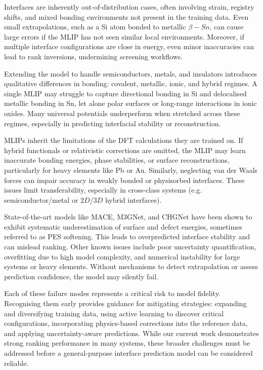Interfaces are inherently out-of-distribution cases, often involving strain, registry shifts, and mixed bonding environments not present in the training data\cite{Khot2025-hh, Gerber2023-yd, Batzner2022-fd, Saidi2017-ab}.
Even small extrapolations, such as a Si atom bonded to metallic $\beta-Sn$, can cause large errors if the MLIP has not seen similar local environments\cite{Khot2025-hh, Batzner2022-fd, Schutt2019-sz}.
Moreover, if multiple interface configurations are close in energy, even minor inaccuracies can lead to rank inversions, undermining screening workflows\cite{Leung2020-tv, Di_Liberto2022-gz, Gerber2023-yd}.

Extending the model to handle semiconductors, metals, and insulators introduces qualitative differences in bonding: covalent, metallic, ionic, and hybrid regimes.
A single MLIP may struggle to capture directional bonding in Si and delocalised metallic bonding in Sn, let alone polar surfaces or long-range interactions in ionic oxides\cite{Owen2024-wp, Butler2019-ws}.
Many universal potentials underperform when stretched across these regimes, especially in predicting interfacial stability or reconstruction\cite{Leung2020-tv, Deng2023-tg}.

MLIPs inherit the limitations of the DFT calculations they are trained on\cite{Schutt2019-sz, Deng2023-tg, Wang2024-tn}.
If hybrid functionals or relativistic corrections are omitted, the MLIP may learn inaccurate bonding energies, phase stabilities, or surface reconstructions, particularly for heavy elements like Pb or Au. Similarly, neglecting van der Waals forces can impair accuracy in weakly bonded or physisorbed interfaces.
These issues limit transferability, especially in cross-class systems (e.g. semiconductor/metal or $2D$/$3D$ hybrid interfaces)\cite{Schutt2019-sz, Leung2020-tv, Rosen2022-pw, Deng2023-tg}.

State-of-the-art models like MACE, M3GNet\cite{brlec2023_interfaceML}, and CHGNet have been shown to exhibit systematic underestimation of surface and defect energies, sometimes referred to as PES softening.
This leads to overpredicted interface stability and can mislead ranking.
Other known issues include poor uncertainty quantification, overfitting due to high model complexity, and numerical instability for large systems or heavy elements.
Without mechanisms to detect extrapolation or assess prediction confidence, the model may silently fail\cite{Batatia2022-xz, Deng2023-tg, Pitfield2025-ah}.

Each of these failure modes represents a critical risk to model fidelity.
Recognising them early provides guidance for mitigating strategies: expanding and diversifying training data, using active learning to discover critical configurations, incorporating physics-based corrections into the reference data, and applying uncertainty-aware predictions.
While our current work demonstrates strong ranking performance in many systems, these broader challenges must be addressed before a general-purpose interface prediction model can be considered reliable.

